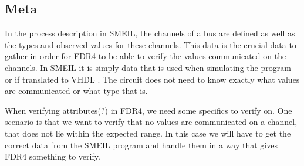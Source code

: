 \subsection{Meta}

In the process description in SMEIL, the channels of a bus are defined as well as the types and observed values for these channels. This data is the crucial data to gather in order for FDR4 to be able to verify the values communicated on the channels. In SMEIL it is simply data that is used when simulating the program or if translated to VHDL
. The circuit does not need to know exactly what values are communicated or what type that is.


When verifying attributes(?) in FDR4, we need some specifics to verify on. One scenario is that we want to verify that no values are communicated on a channel, that does not lie within the expected range. In this case we will have to get the correct data from the SMEIL program and handle them in a way that gives FDR4 something to verify.
